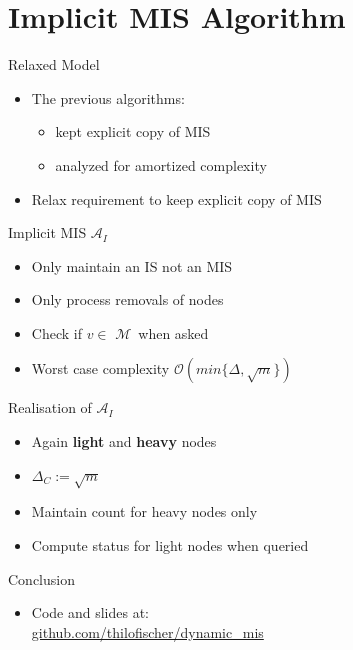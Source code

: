 \documentclass{beamer}
\newcommand{\implicit}{$\mathcal{A}_I$}
\newcommand{\M}{$\mathcal{M}$}
\begin{document}
\section{Implicit MIS Algorithm}
\begin{frame}{Relaxed Model}
  \begin{itemize}
    \item The previous algorithms:
    \begin{itemize}
      \item kept explicit copy of MIS
      \item analyzed for amortized complexity
    \end{itemize}
    \pause
    \bigskip
    \item Relax requirement to keep explicit copy of MIS
  \end{itemize} 
\end{frame}

\begin{frame}{Implicit MIS \implicit}
  \begin{itemize}
    \item Only maintain an IS not an MIS
    \item Only process removals of nodes
    \medskip
    \pause
    \item Check if $v \in$ \M\ when asked

    \medskip
    \item Worst case complexity $\mathcal{O}(min\{\Delta, \sqrt{m}\})$
  \end{itemize}
\end{frame}

\begin{frame}{Realisation of \implicit}
  \begin{itemize}
    \item Again \textbf{light} and \textbf{heavy} nodes
    \item $\Delta_C := \sqrt{m}$
    \pause
    \medskip
    \item Maintain count for heavy nodes only
    \item Compute status for light nodes when queried

  \end{itemize}
  
\end{frame}

\begin{frame}{Conclusion}
  \begin{itemize}
    \item Code and slides at: \\
          \href{https://www.github.com/thilofischer/dynamic_mis}{github.com/thilofischer/dynamic\_mis}
  \end{itemize}
\end{frame}
\end{document}

